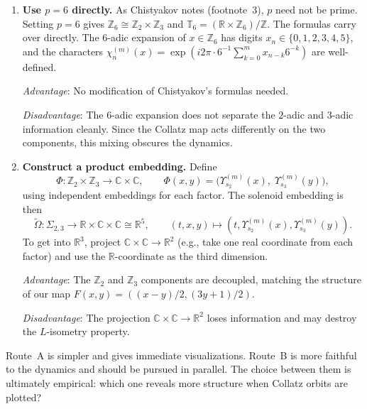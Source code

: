 \documentclass[11pt,a4paper]{article}
\newcommand{\Z}{\mathbb{Z}}
\newcommand{\R}{\mathbb{R}}
\newcommand{\C}{\mathbb{C}}
\newcommand{\T}{\mathbb{T}}
\theoremstyle{plain}
\theoremstyle{definition}
\begin{document}
\begin{enumerate}[label=\textbf{Route \Alph*:}]
    \item \textbf{Use $p = 6$ directly.} As Chistyakov notes (footnote~3), $p$ need not be prime. Setting $p = 6$ gives $\Z_6 \cong \Z_2 \times \Z_3$ and $\T_6 = (\R \times \Z_6)/\Z$. The formulas carry over directly. The $6$-adic expansion of $x \in \Z_6$ has digits $x_n \in \{0, 1, 2, 3, 4, 5\}$, and the characters $\chi_n^{(m)}(x) = \exp(i2\pi \cdot 6^{-1}\sum_{k=0}^{m} x_{n-k} 6^{-k})$ are well-defined.

    \emph{Advantage}: No modification of Chistyakov's formulas needed.

    \emph{Disadvantage}: The $6$-adic expansion does not separate the $2$-adic and $3$-adic information cleanly. Since the Collatz map acts differently on the two components, this mixing obscures the dynamics.

    \item \textbf{Construct a product embedding.} Define
    \begin{equation}
        \Phi: \Z_2 \times \Z_3 \to \C \times \C, \qquad
        \Phi(x, y) = \bigl(\Upsilon_{s_2}^{(m)}(x),\; \Upsilon_{s_3}^{(m)}(y)\bigr),
    \end{equation}
    using independent embeddings for each factor. The solenoid embedding is then
    \begin{equation}
        \tilde{\Omega}: \Sigma_{2,3} \to \R \times \C \times \C \cong \R^5,
        \qquad (t, x, y) \mapsto (t, \Upsilon_{s_2}^{(m)}(x), \Upsilon_{s_3}^{(m)}(y)).
    \end{equation}
    To get into $\R^3$, project $\C \times \C \to \R^2$ (e.g., take one real coordinate from each factor) and use the $\R$-coordinate as the third dimension.

    \emph{Advantage}: The $\Z_2$ and $\Z_3$ components are decoupled, matching the structure of our map $F(x,y) = ((x-y)/2, (3y+1)/2)$.

    \emph{Disadvantage}: The projection $\C \times \C \to \R^2$ loses information and may destroy the $L$-isometry property.
\end{enumerate}

\begin{nextstep}
    Route~A is simpler and gives immediate visualizations. Route~B is more faithful to the dynamics and should be pursued in parallel. The choice between them is ultimately empirical: which one reveals more structure when Collatz orbits are plotted?
\end{nextstep}
\end{document}
